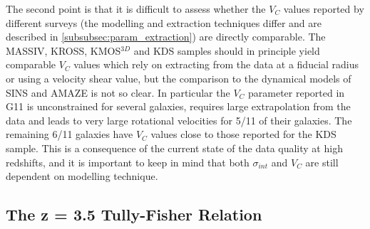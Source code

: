 \documentclass[fleqn,usenatbib]{mn2e}
\begin{document}
The second point is that it is difficult to assess whether the $V_{C}$ values reported by different surveys (the modelling and extraction techniques differ and are described in \cref{subsubsec:param_extraction}) are directly comparable.
The MASSIV, KROSS, KMOS$^{3D}$ and KDS samples should in principle yield comparable $V_{C}$ values which rely on extracting from the data at a fiducial radius or using a velocity shear value, but the comparison to the dynamical models of SINS and AMAZE is not so clear.
In particular the $V_{C}$ parameter reported in G11 is unconstrained for several galaxies, requires large extrapolation from the data and leads to very large rotational velocities for 5/11 of their galaxies.
The remaining 6/11 galaxies have $V_{C}$ values close to those reported for the KDS sample.
This is a consequence of the current state of the data quality at high redshifts, and it is important to keep in mind that both $\sigma_{int}$ and $V_{C}$ are still dependent on modelling technique.

\subsection{The z = 3.5 Tully-Fisher Relation}\label{subsec:TF}
\end{document}
